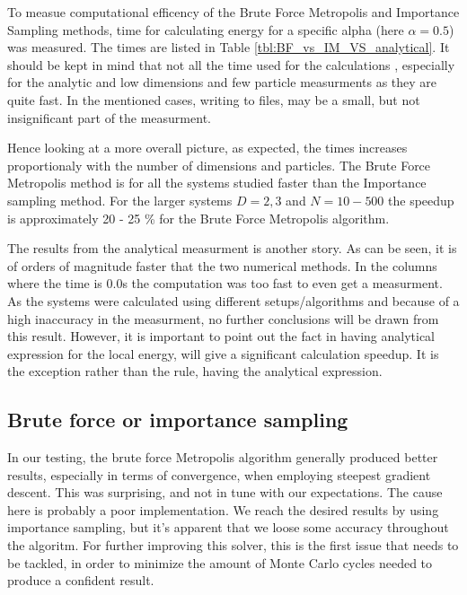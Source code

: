 \documentclass[
]{article}
\begin{document}
To measue computational efficency of the Brute Force Metropolis and
Importance Sampling methods, time for calculating energy for a specific
alpha (here \(\alpha = 0.5\)) was measured. The times are listed in
Table \ref{tbl:BF_vs_IM_VS_analytical}. It should be kept in mind that
not all the time used for the calculations , especially for the analytic
and low dimensions and few particle measurments as they are quite fast.
In the mentioned cases, writing to files, may be a small, but not
insignificant part of the measurment.

Hence looking at a more overall picture, as expected, the times
increases proportionaly with the number of dimensions and particles. The
Brute Force Metropolis method is for all the systems studied faster than
the Importance sampling method. For the larger systems \(D = 2,3\) and
\(N = 10 - 500\) the speedup is approximately 20 - 25 \% for the Brute
Force Metropolis algorithm.

The results from the analytical measurment is another story. As can be
seen, it is of orders of magnitude faster that the two numerical
methods. In the columns where the time is \(0.0\)s the computation was
too fast to even get a measurment. As the systems were calculated using
different setups/algorithms and because of a high inaccuracy in the
measurment, no further conclusions will be drawn from this result.
However, it is important to point out the fact in having analytical
expression for the local energy, will give a significant calculation
speedup. It is the exception rather than the rule, having the analytical
expression.

\hypertarget{brute-force-or-importance-sampling}{%
\subsection*{Brute force or importance
sampling}\label{brute-force-or-importance-sampling}}

In our testing, the brute force Metropolis algorithm generally produced
better results, especially in terms of convergence, when employing
steepest gradient descent. This was surprising, and not in tune with our
expectations. The cause here is probably a poor implementation. We reach
the desired results by using importance sampling, but it's apparent that
we loose some accuracy throughout the algoritm. For further improving
this solver, this is the first issue that needs to be tackled, in order
to minimize the amount of Monte Carlo cycles needed to produce a
confident result.
\end{document}
